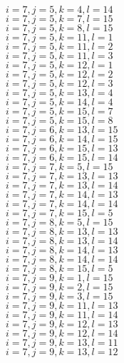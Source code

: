 \documentclass[14pt]{article}
\begin{document}
    $i=7,j=5,k=4,l=14 $ \\ 
    $i=7,j=5,k=7,l=15 $ \\ 
    $i=7,j=5,k=8,l=15 $ \\ 
    $i=7,j=5,k=11,l=1 $ \\ 
    $i=7,j=5,k=11,l=2 $ \\ 
    $i=7,j=5,k=11,l=3 $ \\ 
    $i=7,j=5,k=12,l=1 $ \\ 
    $i=7,j=5,k=12,l=2 $ \\ 
    $i=7,j=5,k=12,l=3 $ \\ 
    $i=7,j=5,k=13,l=4 $ \\ 
    $i=7,j=5,k=14,l=4 $ \\ 
    $i=7,j=5,k=15,l=7 $ \\ 
    $i=7,j=5,k=15,l=8 $ \\ 
    $i=7,j=6,k=13,l=15 $ \\ 
    $i=7,j=6,k=14,l=15 $ \\ 
    $i=7,j=6,k=15,l=13 $ \\ 
    $i=7,j=6,k=15,l=14 $ \\ 
    $i=7,j=7,k=5,l=15 $ \\ 
    $i=7,j=7,k=13,l=13 $ \\ 
    $i=7,j=7,k=13,l=14 $ \\ 
    $i=7,j=7,k=14,l=13 $ \\ 
    $i=7,j=7,k=14,l=14 $ \\ 
    $i=7,j=7,k=15,l=5 $ \\ 
    $i=7,j=8,k=5,l=15 $ \\ 
    $i=7,j=8,k=13,l=13 $ \\ 
    $i=7,j=8,k=13,l=14 $ \\ 
    $i=7,j=8,k=14,l=13 $ \\ 
    $i=7,j=8,k=14,l=14 $ \\ 
    $i=7,j=8,k=15,l=5 $ \\ 
    $i=7,j=9,k=1,l=15 $ \\ 
    $i=7,j=9,k=2,l=15 $ \\ 
    $i=7,j=9,k=3,l=15 $ \\ 
    $i=7,j=9,k=11,l=13 $ \\ 
    $i=7,j=9,k=11,l=14 $ \\ 
    $i=7,j=9,k=12,l=13 $ \\ 
    $i=7,j=9,k=12,l=14 $ \\ 
    $i=7,j=9,k=13,l=11 $ \\ 
    $i=7,j=9,k=13,l=12 $ \\ 
\end{document}

